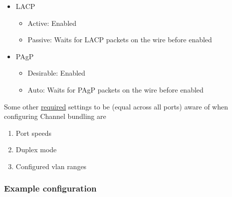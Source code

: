 \begin{itemize}
    \item LACP
    \begin{itemize}
        \item Active: Enabled
        \item Passive: Waits for LACP packets on the wire before enabled
    \end{itemize}
    \item PAgP
    \begin{itemize}
        \item Desirable: Enabled
        \item Auto: Waits for PAgP packets on the wire before enabled
    \end{itemize}
\end{itemize}

Some other \underline{required} settings to be (equal across all ports) aware of when configuring Channel bundling are
\begin{enumerate}
    \item Port speeds
    \item Duplex mode
    \item Configured vlan ranges
\end{enumerate}

\subsubsection{Example configuration}
